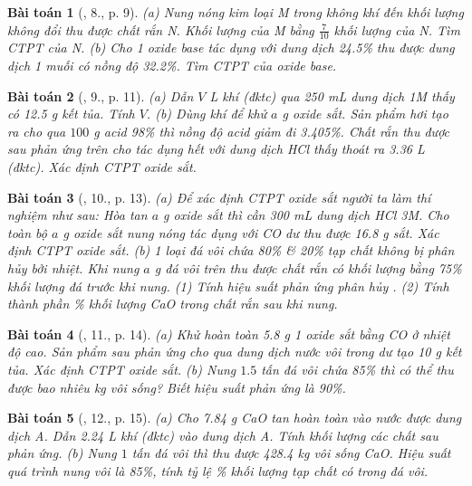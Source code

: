 \documentclass{article}
\newtheorem{baitoan}{Bài toán}
\begin{document}
\begin{baitoan}[\cite{An_350_BT_Hoa_Hoc_9}, 8., p. 9]
	(a) Nung nóng kim loại M trong không khí đến khối lượng không đổi thu được chất rắn N. Khối lượng của M bằng $\frac{7}{10}$ khối lượng của N. Tìm CTPT của N. (b) Cho 1 oxide base tác dụng với dung dịch \emph{ 24.5\%} thu được dung dịch 1 muối có nồng độ \emph{32.2\%}. Tìm CTPT của oxide base.
\end{baitoan}

\begin{baitoan}[\cite{An_350_BT_Hoa_Hoc_9}, 9., p. 11]
	(a) Dẫn $V$ \emph{L} khí \emph{} (đktc) qua \emph{250 mL} dung dịch \emph{ 1M} thấy có \emph{12.5 g} kết tủa. Tính $V$. (b) Dùng khí \emph{} để khử $a$ \emph{g} oxide sắt. Sản phẩm hơi tạo ra cho qua $100$ \emph{g} acid \emph{ 98\%} thì nồng độ acid giảm đi \emph{3.405\%}. Chất rắn thu được sau phản ứng trên cho tác dụng hết với dung dịch \emph{HCl} thấy thoát ra \emph{3.36 L} \emph{} (đktc). Xác định CTPT oxide sắt.
\end{baitoan}

\begin{baitoan}[\cite{An_350_BT_Hoa_Hoc_9}, 10., p. 13]
	(a) Để xác định CTPT oxide sắt người ta làm thí nghiệm như sau: Hòa tan $a$ \emph{g} oxide sắt thì cần \emph{300 mL} dung dịch \emph{HCl 3M}. Cho toàn bộ $a$ \emph{g} oxide sắt nung nóng tác dụng với \emph{CO} dư thu được \emph{16.8 g} sắt. Xác định CTPT oxide sắt. (b) 1 loại đá vôi chứa \emph{80\% } \& \emph{20\%} tạp chất không bị phân hủy bởi nhiệt. Khi nung $a$ \emph{g} đá vôi trên thu được chất rắn có khối lượng bằng \emph{75\%} khối lượng đá trước khi nung. (1) Tính hiệu suất phản ứng phân hủy \emph{}. (2) Tính thành phần \% khối lượng \emph{CaO} trong chất rắn sau khi nung.
\end{baitoan}

\begin{baitoan}[\cite{An_350_BT_Hoa_Hoc_9}, 11., p. 14]
	(a) Khử hoàn toàn \emph{5.8 g} 1 oxide sắt bằng \emph{CO} ở nhiệt độ cao. Sản phẩm sau phản ứng cho qua dung dịch nước vôi trong dư tạo \emph{10 g} kết tủa. Xác định CTPT oxide sắt. (b) Nung $1.5$ tấn đá vôi chứa \emph{85\% } thì có thể thu được bao nhiêu \emph{kg} vôi sống? Biết hiệu suất phản ứng là \emph{90\%}.
\end{baitoan}

\begin{baitoan}[\cite{An_350_BT_Hoa_Hoc_9}, 12., p. 15]
	(a) Cho \emph{7.84 g CaO} tan hoàn toàn vào nước được dung dịch A. Dẫn \emph{2.24 L} khí \emph{} (đktc) vào dung dịch A. Tính khối lượng các chất sau phản ứng. (b) Nung $1$ tấn đá vôi thì thu được \emph{428.4 kg} vôi sống \emph{CaO}. Hiệu suất quá trình nung vôi là \emph{85\%}, tính tỷ lệ \emph{\%} khối lượng tạp chất có trong đá vôi.
\end{baitoan}
\end{document}
